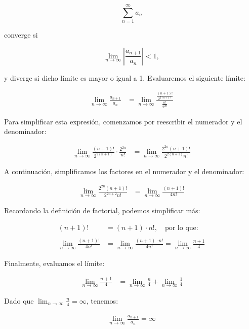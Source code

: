 \documentclass{article}
\begin{document}
    $$
    \sum_{n=1}^{\infty} a_n
    $$

    converge si

    $$
    \lim_{n \rightarrow \infty} \left| \frac{a_{n+1}}{a_{n}} \right| < 1,
    $$

    y diverge si dicho límite es mayor o igual a 1. Evaluaremos el siguiente límite:

    \begin{align*}
    \lim _{n \rightarrow \infty} \frac{a_{n+1}}{a_{n}} &= \lim _{n \rightarrow \infty} \frac{\frac{(n+1)!}{2^{2(n+1)}}}{\frac{n!}{2^{2 n}}}
    \end{align*}

    Para simplificar esta expresión, comenzamos por reescribir el numerador y el denominador:

    \begin{align*}
    \lim _{n \rightarrow \infty} \frac{(n+1)!}{2^{2(n+1)}} \cdot \frac{2^{2n}}{n!} &= \lim _{n \rightarrow \infty} \frac{2^{2 n}(n+1)!}{2^{2(n+1)} n!}
    \end{align*}

    A continuación, simplificamos los factores en el numerador y el denominador:

    \begin{align*}
    \lim _{n \rightarrow \infty} \frac{2^{2 n}(n+1)!}{2^{2 n + 2} n!} &= \lim _{n \rightarrow \infty} \frac{(n+1)!}{4 n!}
    \end{align*}

    Recordando la definición de factorial, podemos simplificar más:

    \begin{align*}
    (n+1)! &= (n+1) \cdot n!, \quad \text{por lo que:} \\\\
    \lim _{n \rightarrow \infty} \frac{(n+1)!}{4 n!} &= \lim _{n \rightarrow \infty} \frac{(n+1) \cdot n!}{4 n!} = \lim _{n \rightarrow \infty} \frac{n+1}{4}
    \end{align*}

    Finalmente, evaluamos el límite:

    \begin{align*}
    \lim _{n \rightarrow \infty} \frac{n+1}{4} &= \lim _{n \rightarrow \infty} \frac{n}{4} + \lim _{n \rightarrow \infty} \frac{1}{4}
    \end{align*}

    Dado que \( \lim_{n \rightarrow \infty} \frac{n}{4} = \infty \), tenemos:

    \begin{align*}
    \lim _{n \rightarrow \infty} \frac{a_{n+1}}{a_{n}} = \infty
    \end{align*}
\end{document}
